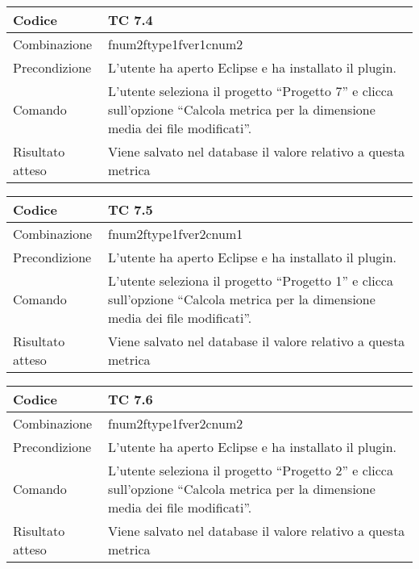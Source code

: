 \begin{table}[ht]
\begin{tabular}{|p{3cm}|p{9cm}|}
\hline
\cellcolor{lightgray}Codice				& TC 7.4								\\
\hline
\cellcolor{lightgray}Combinazione		& fnum2ftype1fver1cnum2							\\
\hline
\cellcolor{lightgray}Precondizione		& L'utente ha aperto Eclipse e ha installato il plugin.			\\
\hline
\cellcolor{lightgray}Comando			& L'utente seleziona il progetto ``Progetto 7''  e clicca sull'opzione ``Calcola metrica per la dimensione media dei file modificati''.	\\
\hline
\cellcolor{lightgray}Risultato atteso	& Viene salvato nel database il valore relativo a questa metrica	\\
\hline
\end{tabular}
\end{table}

\begin{table}[ht]
\begin{tabular}{|p{3cm}|p{9cm}|}
\hline
\cellcolor{lightgray}Codice				& TC 7.5								\\
\hline
\cellcolor{lightgray}Combinazione		& fnum2ftype1fver2cnum1 									\\
\hline
\cellcolor{lightgray}Precondizione		& L'utente ha aperto Eclipse e ha installato il plugin.			\\
\hline
\cellcolor{lightgray}Comando			& L'utente seleziona il progetto ``Progetto 1''  e clicca sull'opzione ``Calcola metrica per la dimensione media dei file modificati''.	\\
\hline
\cellcolor{lightgray}Risultato atteso	& Viene salvato nel database il valore relativo a questa metrica	\\
\hline
\end{tabular}
\end{table}

\begin{table}[ht]
\begin{tabular}{|p{3cm}|p{9cm}|}
\hline
\cellcolor{lightgray}Codice				& TC 7.6								\\
\hline
\cellcolor{lightgray}Combinazione		& fnum2ftype1fver2cnum2								\\
\hline
\cellcolor{lightgray}Precondizione		& L'utente ha aperto Eclipse e ha installato il plugin.				\\
\hline
\cellcolor{lightgray}Comando			& L'utente seleziona il progetto ``Progetto 2''  e clicca sull'opzione ``Calcola metrica per la dimensione media dei file modificati''.	\\
\hline
\cellcolor{lightgray}Risultato atteso	& Viene salvato nel database il valore relativo a questa metrica	\\
\hline
\end{tabular}
\end{table}

